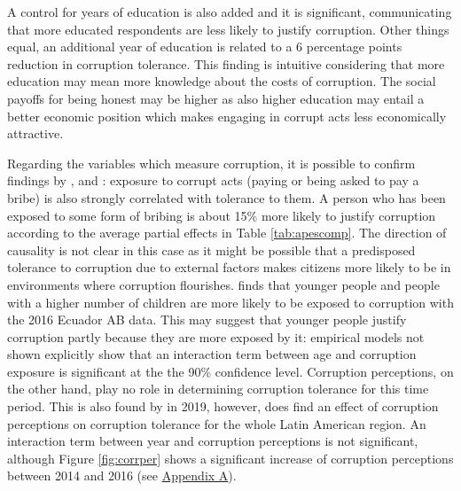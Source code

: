 \documentclass[12pt,a4]{article}\usepackage[]{graphicx}\usepackage[]{xcolor}
\begin{document}
A control for years of education is also added and it is significant, communicating that more educated respondents are less likely to justify corruption. Other things equal, an additional year of education is related to a 6 percentage points reduction in corruption tolerance. This finding is intuitive considering that more education may mean more knowledge about the costs of corruption. The social payoffs for being honest may be higher as also higher education may entail a better economic position which makes engaging in corrupt acts less economically attractive. 

Regarding the variables which measure corruption, it is possible to confirm findings by \textcite{Moscoso.2020}, \textcite{Lupu.2017} and \textcite{Singer.2016}: exposure to corrupt acts (paying or being asked to pay a bribe) is also strongly correlated with tolerance to them. A person who has been exposed to some form of bribing is about 15\% more likely to justify corruption according to the average partial effects in Table \ref{tab:apescomp}. The direction of causality is not clear in this case as it might be possible that a predisposed tolerance to corruption due to external factors makes citizens more likely to be in environments where corruption flourishes. \textcite{Moscoso.2018} finds that younger people and people with a higher number of children are more likely to be exposed to corruption with the 2016 Ecuador AB data. This may suggest that younger people justify corruption partly because they are more exposed by it: empirical models not shown explicitly show that an interaction term between age and corruption exposure is significant at the the 90\% confidence level. Corruption perceptions, on the other hand, play no role in determining corruption tolerance for this time period. This is also found by \textcite{Moscoso.2020} in 2019, however, \textcite{Lupu.2017} does find an effect of corruption perceptions on corruption tolerance for the whole Latin American region. An interaction term between year and corruption perceptions is not significant, although Figure \ref{fig:corrper} shows a significant increase of corruption perceptions between 2014 and 2016 (see \hyperref[app:first]{Appendix A}). 

\end{document}

